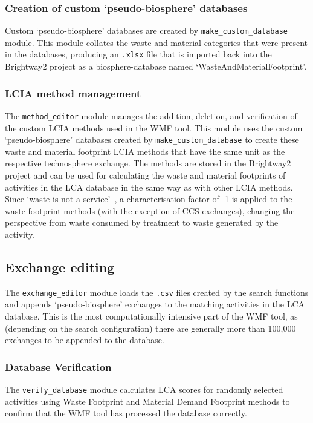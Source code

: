 \subsubsection{Creation of custom `pseudo-biosphere' databases}
Custom `pseudo-biosphere' databases are created by \texttt{make\_custom\_database} module. This module collates the waste and material categories that were present in the databases, producing an \texttt{.xlsx} file that is imported back into the Brightway2 project as a biosphere-database named `WasteAndMaterialFootprint'. 

\subsubsection{LCIA method management}
The \texttt{method\_editor} module manages the addition, deletion, and verification of the custom LCIA methods used in the WMF tool. This module uses the custom `pseudo-biosphere' databases created by \texttt{make\_custom\_database} to create these waste and material footprint LCIA methods that have the same unit as the respective technosphere exchange. The methods are stored in the Brightway2 project and can be used for calculating the waste and material footprints of activities in the LCA database in the same way as with other LCIA methods. Since `waste is not a service'~\citep{guinee2021wasteisnotaservice}, a characterisation factor of -1 is applied to the waste footprint methods (with the exception of CCS exchanges), changing the perspective from waste consumed by treatment to waste generated by the activity.

\subsection{Exchange editing}
The \texttt{exchange\_editor} module loads the \texttt{.csv} files created by the search functions and appends `pseudo-biosphere' exchanges to the matching activities in the LCA database. This is the most computationally intensive part of the WMF tool, as (depending on the search configuration) there are generally more than 100,000 exchanges to be appended to the database. 

\subsubsection{Database Verification}
The \texttt{verify\_database} module calculates LCA scores for randomly selected activities using Waste Footprint and Material Demand Footprint methods to confirm that the WMF tool has processed the database correctly.

